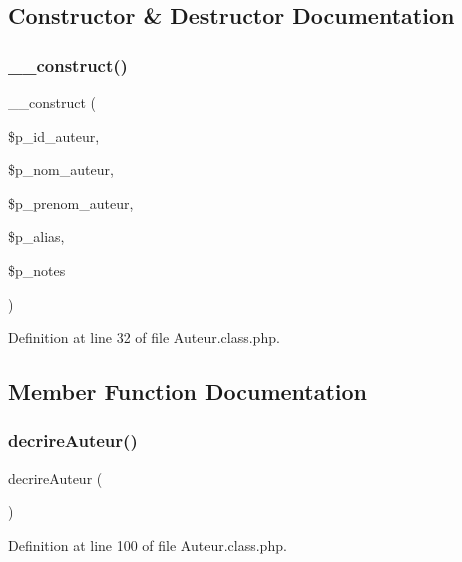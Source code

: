 \subsection{Constructor \& Destructor Documentation}
\mbox{\label{class_auteur_a64e72637d627d503760707d6638860d3}} 
\subsubsection{\texorpdfstring{\+\_\+\+\_\+construct()}{\_\_construct()}}
{\footnotesize\ttfamily \+\_\+\+\_\+construct (\begin{DoxyParamCaption}\item[{}]{\$p\+\_\+id\+\_\+auteur,  }\item[{}]{\$p\+\_\+nom\+\_\+auteur,  }\item[{}]{\$p\+\_\+prenom\+\_\+auteur,  }\item[{}]{\$p\+\_\+alias,  }\item[{}]{\$p\+\_\+notes }\end{DoxyParamCaption})}



Definition at line 32 of file Auteur.\+class.\+php.



\subsection{Member Function Documentation}
\mbox{\label{class_auteur_a2526419428708f513a6e99dbc9d0653a}} 
\subsubsection{\texorpdfstring{decrire\+Auteur()}{decrireAuteur()}}
{\footnotesize\ttfamily decrire\+Auteur (\begin{DoxyParamCaption}{ }\end{DoxyParamCaption})}



Definition at line 100 of file Auteur.\+class.\+php.

\mbox{\label{class_auteur_a26e3e0c627051b4287204b3575b81d97}} 
